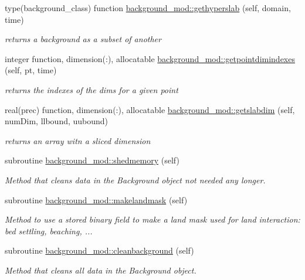 \begin{DoxyCompactItemize}
type(background\+\_\+class) function \mbox{\hyperlink{namespacebackground__mod_ae26fda3baab915148ec5749d1eda2ea6}{background\+\_\+mod\+::gethyperslab}} (self, domain, time)
\begin{DoxyCompactList}\small\item\em returns a background as a subset of another \end{DoxyCompactList}\item 
integer function, dimension(\+:), allocatable \mbox{\hyperlink{namespacebackground__mod_ac799224ce7ad219bf1fb4f1f42508f45}{background\+\_\+mod\+::getpointdimindexes}} (self, pt, time)
\begin{DoxyCompactList}\small\item\em returns the indexes of the dims for a given point \end{DoxyCompactList}\item 
real(prec) function, dimension(\+:), allocatable \mbox{\hyperlink{namespacebackground__mod_a09d61976c4545e8753eb4594044b109d}{background\+\_\+mod\+::getslabdim}} (self, num\+Dim, llbound, uubound)
\begin{DoxyCompactList}\small\item\em returns an array witn a sliced dimension \end{DoxyCompactList}\item 
subroutine \mbox{\hyperlink{namespacebackground__mod_a2c75c9011305adad2f19fc2233df700d}{background\+\_\+mod\+::shedmemory}} (self)
\begin{DoxyCompactList}\small\item\em Method that cleans data in the Background object not needed any longer. \end{DoxyCompactList}\item 
subroutine \mbox{\hyperlink{namespacebackground__mod_ad6c54d2cf1d1981fb928cd14d387aa8b}{background\+\_\+mod\+::makelandmask}} (self)
\begin{DoxyCompactList}\small\item\em Method to use a stored binary field to make a land mask used for land interaction\+: bed settling, beaching, ... \end{DoxyCompactList}\item 
subroutine \mbox{\hyperlink{namespacebackground__mod_a1610fcc9ce260beb3c35418e92a63391}{background\+\_\+mod\+::cleanbackground}} (self)
\begin{DoxyCompactList}\small\item\em Method that cleans all data in the Background object. \end{DoxyCompactList}\item 

\end{DoxyCompactItemize}
